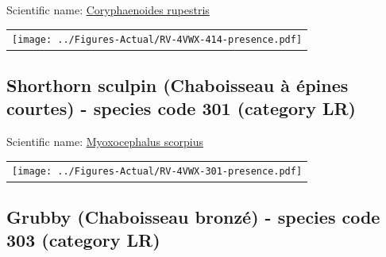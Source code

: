 \documentclass[12pt]{article}\usepackage[]{graphicx}\usepackage[]{color}
\begin{document}

Scientific name: \href{http://www.marinespecies.org/aphia.php?p=taxdetails\&id=158960}{Coryphaenoides rupestris} \newline
\begin{minipage}{1.0\textwidth}
 \begin{tabular}{c}
\texttt{[image: ../Figures-Actual/RV-4VWX-414-presence.pdf]} \\ 
\end{tabular} 
\end{minipage}
\clearpage

\renewcommand\thefigure{\thesubsection\Alph{figure}}

\setcounter{figure}{0}

\hypertarget{sec:301}{%
\subsection{Shorthorn sculpin (Chaboisseau à épines courtes) - species code 301 (category LR)}\label{sec:301}}

  


Scientific name: \href{http://www.marinespecies.org/aphia.php?p=taxdetails\&id=127203}{Myoxocephalus scorpius} \newline
\begin{minipage}{1.0\textwidth}
 \begin{tabular}{c}
\texttt{[image: ../Figures-Actual/RV-4VWX-301-presence.pdf]} \\ 
\end{tabular} 
\end{minipage}
\clearpage

\renewcommand\thefigure{\thesubsection\Alph{figure}}

\setcounter{figure}{0}

\hypertarget{sec:303}{%
\subsection{Grubby (Chaboisseau bronzé) - species code 303 (category LR)}\label{sec:303}}

  
\end{document}
